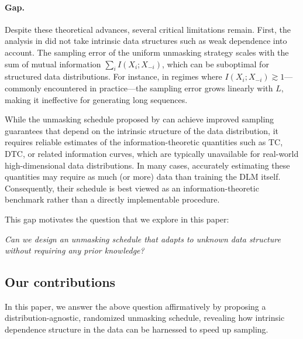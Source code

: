 \documentclass[english]{article}
\begin{document}
\paragraph{Gap.}
Despite these theoretical advances, several critical limitations remain.
First, the analysis in \citet{li2025breaking} did not take intrinsic data structures such as weak dependence into account. The sampling error of the uniform unmasking strategy scales with the sum of mutual information $\sum_i I(X_i;X_{-i})$, which can be suboptimal for structured data distributions.
For instance, in regimes where $I(X_i;X_{-i}) \gtrsim 1$---commonly encountered in practice---the sampling error grows linearly with $L$, making it ineffective for generating long sequences.

While the unmasking schedule proposed by \citet{chen2025optimal} can achieve improved sampling guarantees that depend on the intrinsic structure of the data distribution, it requires reliable estimates of the information-theoretic quantities such as TC, DTC, or related information curves, which are typically unavailable for real-world high-dimensional data distributions.    
In many cases, accurately estimating these quantities may require as much (or more) data than training the DLM itself. Consequently, their schedule is best viewed as an information-theoretic benchmark rather than a directly implementable procedure.

This gap motivates the question that we explore in this paper:
\begin{center}
\textit{Can we design an unmasking schedule that adapts to unknown data structure without requiring any prior knowledge?}
\end{center}


\subsection{Our contributions}
In this paper, we answer the above question affirmatively by proposing a distribution-agnostic, randomized unmasking schedule, revealing how intrinsic dependence structure in the data can be harnessed to speed up sampling.
\end{document}

